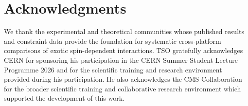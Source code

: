 \documentclass[aps,prd,reprint,superscriptaddress,nofootinbib]{revtex4-2}
\begin{document}
	\section*{Acknowledgments}
	
	We thank the experimental and theoretical communities whose published
	results and constraint data provide the foundation for systematic
	cross-platform comparisons of exotic spin-dependent interactions.
	TSO gratefully acknowledges CERN for sponsoring his participation in
	the CERN Summer Student Lecture Programme 2026 and for the scientific
	training and research environment provided during his participation.
	He also acknowledges the CMS Collaboration for the broader scientific
	training and collaborative research environment which supported the development of this work.
	
	
	
	
	
\end{document}
